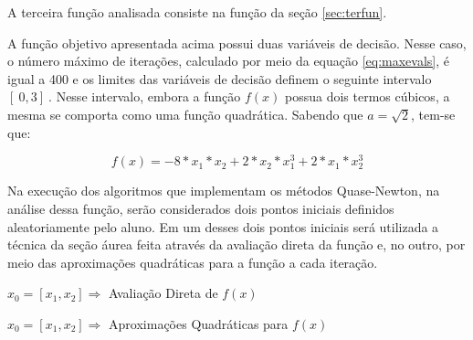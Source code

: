 



A terceira função analisada consiste na função da seção \ref{sec:terfun}.

A função objetivo apresentada acima possui duas variáveis de decisão. Nesse caso, o número máximo de iterações, calculado por meio da equação \ref{eq:maxevals}, é igual a 400 e os limites das variáveis de decisão definem o seguinte intervalo $[\ 0 , 3 ]\ $. Nesse intervalo, embora a função $f(x)$ possua dois termos cúbicos, a mesma se comporta como uma função quadrática. Sabendo que $a=\sqrt{2}$, tem-se que:

\begin{equation*} 
    f(x) = -8*x_1*x_2+2*x_2*x_1^3+2*x_1*x_2^3
\end{equation*}

Na execução dos algoritmos que implementam os métodos Quase-Newton, na análise dessa função, serão considerados dois pontos iniciais definidos aleatoriamente pelo aluno. Em um desses dois pontos iniciais será utilizada a técnica da seção áurea feita através da avaliação direta da função e, no outro, por meio das aproximações quadráticas para a função a cada iteração.

\begin{minipage}{\linewidth}
    \centering
    $x_0=[x_1,x_2]\Longrightarrow$  Avaliação Direta de $f(x)$
    \label{tab:tblg} 
    \writetable{\tblg}
    \bigskip
\end{minipage}

\begin{minipage}{\linewidth}
    \centering
    $x_0=[x_1,x_2]\Longrightarrow$  Aproximações Quadráticas para $f(x)$
    \label{tab:tblh} 
    \writetable{\tblh}
    \bigskip
\end{minipage}

